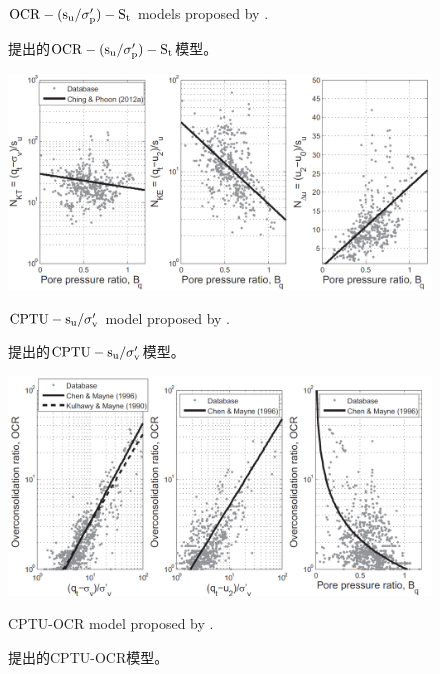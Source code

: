\begin{figure}[!p]
\begin{minipage}[t]{0.48\textwidth}
        \caption{$\rm{OCR}-(s_u/\sigma_p')-S_t$ models proposed by \citet{Ching2012522}.}
        \vspace{-5pt}
        \addtocounter{figure}{-1}
        \renewcommand{\figurename}{图}
        \caption{\citet{Ching2012522}提出的$\rm{OCR}-(s_u/\sigma_p')-S_t$模型。}
        \label{figure:11}
        \renewcommand{\figurename}{Figure}
    \end{minipage}
\end{figure}

\begin{figure}[!p]
    \centering
    \begin{minipage}[t]{0.48\textwidth}
        \centering
        \includegraphics[width=\textwidth]{figures/figure-12.png}
        \caption{$\rm{CPTU}-s_u/\sigma_v'$ model proposed by \citet{Ching2012522}.}
        \vspace{-5pt}
        \addtocounter{figure}{-1}
        \renewcommand{\figurename}{图}
        \caption{\citet{Ching2012522}提出的$\rm{CPTU}-s_u/\sigma_v'$模型。}
        \label{figure:12}
        \renewcommand{\figurename}{Figure}
    \end{minipage}
    \begin{minipage}[t]{0.48\textwidth}
        \centering
        \includegraphics[width=\textwidth]{figures/figure-13.png}
        \caption{CPTU-OCR model proposed by \citet{Chen1996488, Kulhawy1990}.}
        \vspace{-5pt}
        \addtocounter{figure}{-1}
        \renewcommand{\figurename}{图}
        \caption{\citet{Chen1996488, Kulhawy1990}提出的CPTU-OCR模型。}
        \label{figure:13}
        \renewcommand{\figurename}{Figure}
    \end{minipage}
\end{figure}


